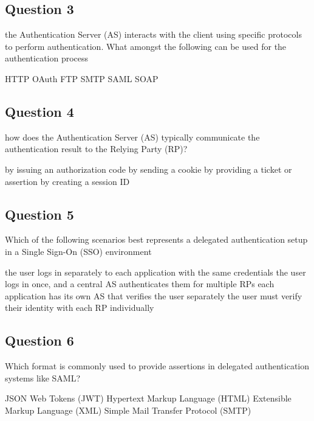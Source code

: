 \subsection*{Question 3}
the Authentication Server (AS) interacts with the client using
specific protocols to perform authentication. What amongst the
following can be used for the authentication process
\begin{itemize}
  \incorrect HTTP 
  \correct OAuth 
  \incorrect FTP
  \incorrect SMTP 
  \correct SAML 
  \incorrect SOAP
\end{itemize}

\subsection*{Question 4}
how does the Authentication Server (AS) typically
communicate the authentication result to the Relying Party (RP)?
\begin{itemize}
  \incorrect  by issuing an authorization code 
  \incorrect  by sending a cookie
  \correct  by providing a ticket or assertion 
  \incorrect  by creating a session ID
\end{itemize}

\subsection*{Question 5}
Which of the following scenarios best represents a delegated authentication setup in a Single Sign-On (SSO) environment
\begin{itemize}
  \incorrect  the user logs in separately to each application with the same credentials
  \correct the user logs in once, and a central AS authenticates them for multiple RPs
  \incorrect each application has its own AS that verifies the user separately
  \incorrect the user must verify their identity with each RP individually
\end{itemize}

\subsection*{Question 6}
Which format is commonly used to provide assertions in delegated authentication systems like SAML?
\begin{itemize}
  \incorrect  JSON Web Tokens (JWT)
  \incorrect  Hypertext Markup Language (HTML) 
  \correct  Extensible Markup Language (XML) 
  \incorrect  Simple Mail Transfer Protocol (SMTP)
\end{itemize}

